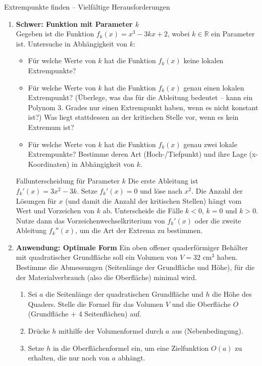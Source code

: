 \begin{aufgabenumgebung}{Extrempunkte finden – Vielfältige Herausforderungen}
\begin{enumerate}
    \item \textbf{Schwer: Funktion mit Parameter $k$} \\
        Gegeben ist die Funktion $f_k(x) = x^3 - 3kx + 2$, wobei $k \in \mathbb{R}$ ein Parameter ist. Untersuche in Abhängigkeit von $k$:
        \begin{itemize}
            \item Für welche Werte von $k$ hat die Funktion $f_k(x)$ keine lokalen Extrempunkte?
            \item Für welche Werte von $k$ hat die Funktion $f_k(x)$ genau einen lokalen Extrempunkt? (Überlege, was das für die Ableitung bedeutet – kann ein Polynom 3. Grades nur einen Extrempunkt haben, wenn es nicht konstant ist?) Was liegt stattdessen an der kritischen Stelle vor, wenn es kein Extremum ist?
            \item Für welche Werte von $k$ hat die Funktion $f_k(x)$ genau zwei lokale Extrempunkte? Bestimme deren Art (Hoch-/Tiefpunkt) und ihre Lage (x-Koordinaten) in Abhängigkeit von $k$.
        \end{itemize}
        \begin{tippumgebung}{Fallunterscheidung für Parameter $k$}
        Die erste Ableitung ist $f_k'(x) = 3x^2 - 3k$. Setze $f_k'(x)=0$ und löse nach $x^2$. Die Anzahl der Lösungen für $x$ (und damit die Anzahl der kritischen Stellen) hängt vom Wert und Vorzeichen von $k$ ab. Unterscheide die Fälle $k<0$, $k=0$ und $k>0$. Nutze dann das Vorzeichenwechselkriterium von $f_k'(x)$ oder die zweite Ableitung $f_k''(x)$, um die Art der Extrema zu bestimmen.
        \end{tippumgebung}
    \item \textbf{Anwendung: Optimale Form}
        Ein oben offener quaderförmiger Behälter mit quadratischer Grundfläche soll ein Volumen von $V=32 \text{ cm}^3$ haben. Bestimme die Abmessungen (Seitenlänge der Grundfläche und Höhe), für die der Materialverbrauch (also die Oberfläche) minimal wird.
        \begin{enumerate}[label=(\alph*)]
            \item Sei $a$ die Seitenlänge der quadratischen Grundfläche und $h$ die Höhe des Quaders. Stelle die Formel für das Volumen $V$ und die Oberfläche $O$ (Grundfläche + 4 Seitenflächen) auf.
            \item Drücke $h$ mithilfe der Volumenformel durch $a$ aus (Nebenbedingung).
            \item Setze $h$ in die Oberflächenformel ein, um eine Zielfunktion $O(a)$ zu erhalten, die nur noch von $a$ abhängt.

\end{enumerate}
\end{enumerate}
\end{aufgabenumgebung}
